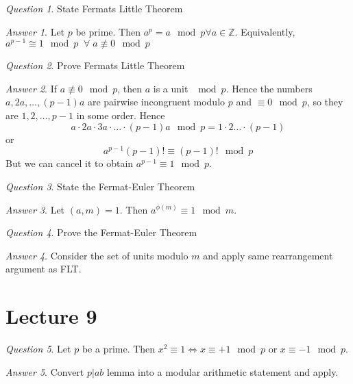 \documentclass[]{article}
\def\integers{\mathbb{Z}}
\theoremstyle{remark}
\theoremstyle{qnstyle}
\newtheorem{question}{Question}
\theoremstyle{answerstyle}
\newtheorem*{answer}{Answer}
\begin{document}
\begin{question}
    State Fermats Little Theorem
\end{question}
\begin{answer}
    Let $p$ be prime. Then $a^p = a \mod p \forall a \in \integers$.
    Equivalently, $a^{p-1} \cong 1 \mod p \;\; \forall \; a \not\equiv 0 \mod p$
\end{answer}

\begin{question}
    Prove Fermats Little Theorem
\end{question}
\begin{answer}
    If $a \not\equiv 0 \mod p$, then $a$ is a unit $\mod p$.
    Hence the numbers $a, 2a, \ldots, (p-1)a$ are pairwise incongruent
    modulo $p$ and $\equiv 0 \mod p$, so they are $1,2,\ldots,p-1$ in some order.
    Hence 
        $$a \cdot 2a \cdot 3a \cdot \ldots \cdot (p-1)a \mod p = 1 \cdot 2 \ldots \cdot(p-1)$$
    or
        $$a^{p-1} (p-1)! \equiv (p-1)! \mod p$$
    But we can cancel it to obtain $a^{p-1} \equiv 1 \mod p$.
\end{answer}

\begin{question}
    State the Fermat-Euler Theorem
\end{question}
\begin{answer}
    Let $(a,m) = 1$. Then $a^{\phi(m)} \equiv 1 \mod m$.
\end{answer}

\begin{question}
    Prove the Fermat-Euler Theorem
\end{question}
\begin{answer}
    Consider the set of units modulo $m$ and apply same rearrangement argument as FLT.
\end{answer}





\section* {Lecture 9}

\begin{question}
    Let $p$ be a prime. Then $x^2 \equiv 1 \iff x \equiv +1 \mod p$ or $x \equiv -1 \mod p$. 
\end{question}
\begin{answer}
    Convert $p | ab$ lemma into a modular arithmetic statement and apply.
\end{answer}
\end{document}
